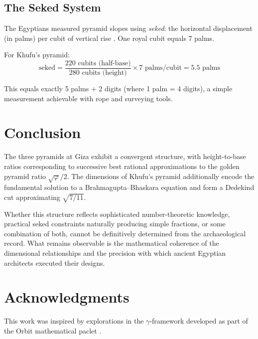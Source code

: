 \documentclass[11pt]{article}
\theoremstyle{definition}
\theoremstyle{remark}
\begin{document}
\subsection{The Seked System}

The Egyptians measured pyramid slopes using \emph{seked}: the horizontal displacement (in palms) per cubit of vertical rise \cite{rossi2004}. One royal cubit equals 7 palms.

For Khufu's pyramid:
\[
\text{seked} = \frac{220 \text{ cubits (half-base)}}{280 \text{ cubits (height)}} \times 7 \text{ palms/cubit} = 5.5 \text{ palms}
\]

This equals exactly 5 palms + 2 digits (where 1 palm = 4 digits), a simple measurement achievable with rope and surveying tools.

\section{Conclusion}

The three pyramids at Giza exhibit a convergent structure, with height-to-base ratios corresponding to successive best rational approximations to the golden pyramid ratio $\sqrt{\varphi}/2$. The dimensions of Khufu's pyramid additionally encode the fundamental solution to a Brahmagupta--Bhaskara equation and form a Dedekind cut approximating $\sqrt{7/11}$.

Whether this structure reflects sophisticated number-theoretic knowledge, practical seked constraints naturally producing simple fractions, or some combination of both, cannot be definitively determined from the archaeological record. What remains observable is the mathematical coherence of the dimensional relationships and the precision with which ancient Egyptian architects executed their designs.

\section*{Acknowledgments}

This work was inspired by explorations in the $\gamma$-framework developed as part of the Orbit mathematical paclet \cite{orbit-paclet}.



\end{document}
